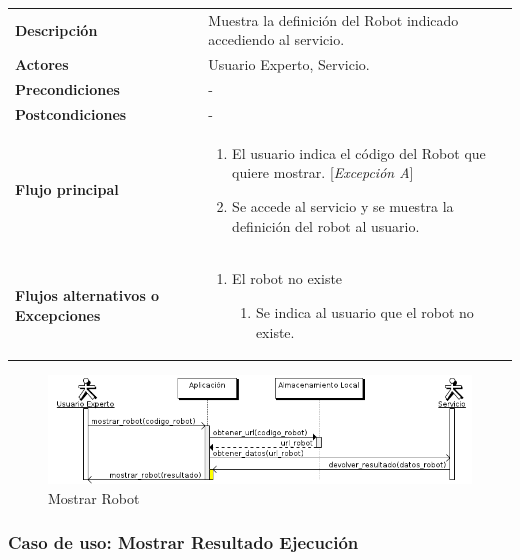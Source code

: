 \begin{tabular}[h]{ p{ } p{ }}

\textbf{Descripción} & Muestra la definición del Robot indicado
accediendo al servicio.\\[3mm]

\textbf{Actores} & Usuario Experto, Servicio.\\[3mm]

\textbf{Precondiciones} & - \\[3mm]

\textbf{Postcondiciones} & - \\[3mm]

\textbf{Flujo principal} & \begin{enumerate}[leftmargin=1em,topsep=0pt, partopsep=0pt]
  \item El usuario indica el código del Robot que quiere mostrar. [\emph{Excepción A}]
  \item Se accede al servicio y se muestra la definición del robot al
    usuario.
\end{enumerate}\\[3mm]

\textbf{Flujos alternativos o Excepciones} &
\begin{enumerate}[label=\Alph*:,leftmargin=1em,topsep=0pt, partopsep=0pt]
\item El robot no existe
  \begin{enumerate}[label=\arabic*.,topsep=0pt, partopsep=0pt]
    \item Se indica al usuario que el robot no existe.
  \end{enumerate}
\end{enumerate}\\[3mm]
\end{tabular}

\begin{figure}[bp!]
  \includegraphics[width=1\textwidth]{chapters/technical-manual/diagrams/sequence/expert_user/mostrar_robot.png}
\caption{Mostrar Robot}
\end{figure}
\clearpage
\subsubsection{\large{Caso de uso: Mostrar Resultado Ejecución}}

